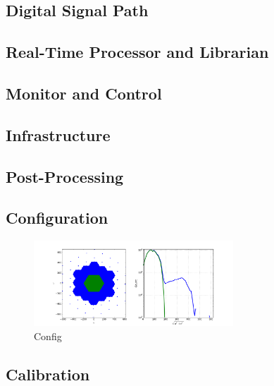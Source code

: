 \documentclass{article}
\begin{document}
\subsection{Digital Signal Path}
\label{sec:DSP}

\subsection{Real-Time Processor and Librarian}
\label{sec:rtplib}

\subsection{Monitor and Control}
\label{sec:moncon}

\subsection{Infrastructure}
\label{sec:infra}

\subsection{Post-Processing}
\label{sec:postproc}

\subsection{Configuration}
\label{sec:config}
\begin{figure}[t]
\centerline{
\includegraphics[width=7.5cm]{plots/config.png} 
}
\caption{\small Config
\label{fig:config}}
\end{figure}

\subsection{Calibration}
\end{document}
